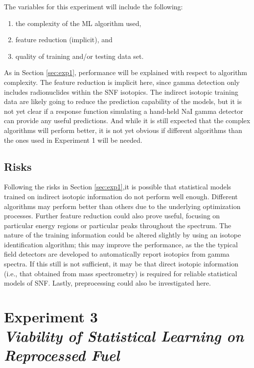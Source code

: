 The variables for this experiment will include the following:
\begin{enumerate}
  \itemsep-0.75em
  \item the complexity of the \gls{ML} algorithm used, 
  \item feature reduction (implicit), and 
  \item quality of training and/or testing data set.
\end{enumerate}
As in Section \ref{sec:exp1}, performance will be explained with respect to
algorithm complexity.  The feature reduction is implicit here, since gamma
detection only includes radionuclides within the \gls{SNF} isotopics. The
indirect isotopic training data are likely going to reduce the prediction
capability of the models, but it is not yet clear if a response function
simulating a hand-held NaI gamma detector can provide any useful predictions.
And while it is still expected that the complex algorithms will perform better,
it is not yet obvious if different algorithms than the ones used in Experiment
1 will be needed. 

\subsection*{Risks}

Following the risks in Section \ref{sec:exp1},it is possible that statistical models trained on indirect isotopic information
do not perform well enough. Different algorithms may perform
better than others due to the underlying optimization processes. Further
feature reduction could also prove useful, focusing on particular energy
regions or particular peaks throughout the spectrum. The nature of the
training information could be altered slightly by using an isotope
identification algorithm; this may improve the performance, as the the typical field detectors are
developed to automatically report isotopics from gamma spectra. If this still
is not sufficient, it may be that direct isotopic information (i.e., that
obtained from mass spectrometry) is required for reliable statistical models of
\gls{SNF}.  Lastly, preprocessing could also be investigated here.

\section[Experiment 3: Other Fuel Cycle Flows]{Experiment 3\\ 
\large{\textit{Viability of Statistical Learning on Reprocessed Fuel}}}
\label{sec:exp3}

